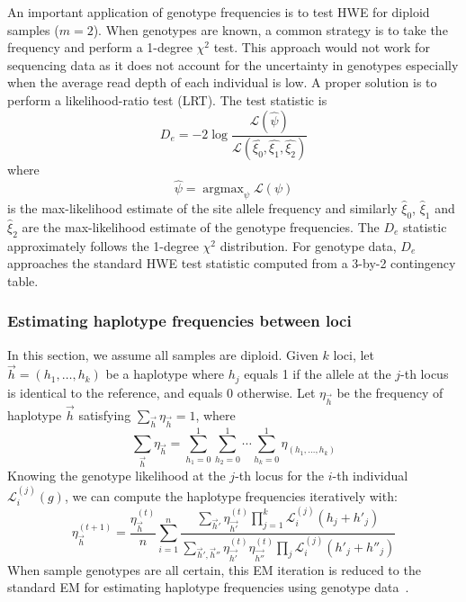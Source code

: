 \documentclass{bioinfo}
\DeclareMathOperator*{\argmax}{argmax}
\begin{document}
\begin{methods}
An important application of genotype frequencies is to test HWE
for diploid samples ($m=2$).  When genotypes are known, a common strategy is to
take the frequency and perform a 1-degree $\chi^2$ test. This approach would
not work for sequencing data as it does not account for the uncertainty in
genotypes especially when the average read depth of each individual is low. A
proper solution is to perform a likelihood-ratio test (LRT). The test statistic is
\begin{equation}\label{eq:hwe}
D_e=-2\log\frac{\mathcal{L}(\hat{\psi})}{\mathcal{L}(\hat{\xi_0},\hat{\xi_1},\hat{\xi_2})}
\end{equation}
where
\begin{equation}\label{eq:psimax}
\hat{\psi}=\argmax_{\psi}\mathcal{L}(\psi)
\end{equation}
is the max-likelihood estimate of the site allele frequency and similarly
$\hat{\xi}_0$, $\hat{\xi}_1$ and $\hat{\xi}_2$ are the max-likelihood estimate
of the genotype frequencies. The $D_e$ statistic approximately follows the
1-degree $\chi^2$ distribution. For genotype data, $D_e$ approaches the standard
HWE test statistic computed from a 3-by-2 contingency table.

\subsubsection{Estimating haplotype frequencies between loci}
In this section, we assume all samples are diploid. Given $k$ loci, let
$\vec{h}=(h_1,\ldots,h_k)$ be a haplotype where $h_j$ equals 1 if the allele at
the $j$-th locus is identical to the reference, and equals 0 otherwise.  Let
$\eta_{\vec{h}}$ be the frequency of haplotype $\vec{h}$ satisfying
$\sum_{\vec{h}}\eta_{\vec{h}}=1$, where
$$
\sum_{\vec{h}}\eta_{\vec{h}}=\sum_{h_1=0}^1\sum_{h_2=0}^1\cdots\sum_{h_k=0}^1\eta_{(h_1,\ldots,h_k)}
$$
Knowing the genotype likelihood at the $j$-th locus for the $i$-th individual
$\mathcal{L}^{(j)}_i(g)$, we can compute the haplotype frequencies iteratively
with:
\begin{equation}\label{equ:hf}
\eta^{(t+1)}_{\vec{h}}=\frac{\eta_{\vec{h}}^{(t)}}{n}\sum_{i=1}^n\frac{\sum_{\vec{h}'}\eta_{\vec{h'}}^{(t)}\prod_{j=1}^k\mathcal{L}^{(j)}_i(h_j+h'_j)}
{\sum_{\vec{h}',\vec{h}''}\eta_{\vec{h'}}^{(t)}\eta_{\vec{h''}}^{(t)}\prod_{j}\mathcal{L}^{(j)}_i(h'_j+h''_j)}
\end{equation}
When sample genotypes are all certain, this EM iteration is reduced to the
standard EM for estimating haplotype frequencies using genotype
data~\citep{Excoffier:1995ly}.


\end{methods}
\end{document}

